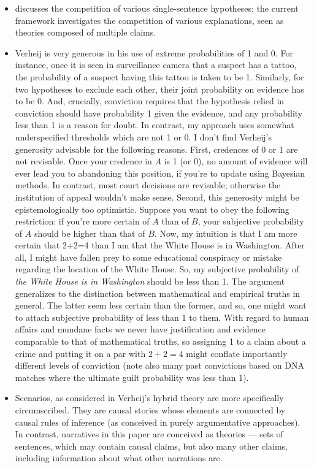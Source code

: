 \documentclass[10pt,leqno]{article}
\begin{document}
\begin{itemize}
\item  \citep{verheij2014catch} discusses the competition of various single-sentence hypotheses; the current framework investigates the competition of various explanations, seen as theories composed of multiple claims.
\item Verheij is very generous in his use of extreme probabilities of 1 and 0. For instance, once it is seen in surveillance camera that a suspect has a tattoo, the probability of a suspect having this tattoo is taken to be 1. Similarly, for two hypotheses to exclude each other, their joint probability on evidence has to be 0. And, crucially, conviction requires that the hypothesis relied in conviction should have probability 1 given the evidence, and any probability less than 1 is a reason for doubt. In contrast, my approach uses somewhat underspecified thresholds which are not 1 or 0.  I don't find Verheij's generosity advisable for the following reasons. First,  credences of 0 or 1 are not revisable. Once your credence in $A$ is 1 (or 0), no amount of evidence will ever lead you to abandoning this position, if you're to update using Bayesian methods. In contrast, most court decisions are revisable; otherwise the institution of appeal wouldn't make sense. Second, this generosity might be epistemologically too optimistic. Suppose you want to obey the following restriction: if you're more certain of $A$ than of $B$, your subjective probability of $A$ should be higher than that of $B$. Now, my intuition is that I am more certain that 2+2=4 than I am that the White House is in Washington. After all, I might have fallen prey to some educational conspiracy or mistake regarding the location of the White House. So, my subjective probability of \emph{the White House is in Washington} should be less than 1. The argument generalizes to the distinction between mathematical and empirical truths in general. The latter seem less certain than the former, and so, one might want to attach subjective probability of less than 1 to them.   With regard to human affairs and mundane facts we never have justification and evidence comparable to that of mathematical truths, so assigning 1 to a claim about a crime and putting it on a par with $2+2=4$ might conflate importantly different levels of conviction (note also many past convictions based on DNA matches where the ultimate guilt probability was less than 1).
\item Scenarios, as considered in Verheij's hybrid theory \citep{verheij2015arguments} are more specifically circumscribed. They are causal stories whose elements are connected by causal rules of inference (as conceived in purely argumentative approaches). In contrast, narratives in this paper are conceived as theories --- sets of sentences, which may contain causal claims, but also many other claims, including information about what other narrations are. 

\end{itemize}
\end{document}
